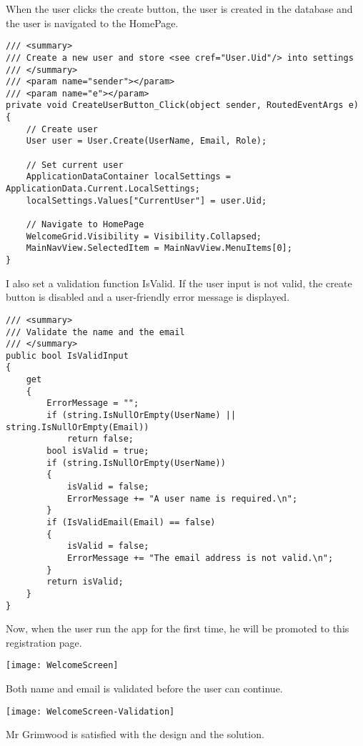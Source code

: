 \documentclass[report.tex]{subfiles}
\begin{document}
When the user clicks the create button, the user is created in the database and the user is navigated to the HomePage.

\begin{verbatim}
/// <summary>
/// Create a new user and store <see cref="User.Uid"/> into settings
/// </summary>
/// <param name="sender"></param>
/// <param name="e"></param>
private void CreateUserButton_Click(object sender, RoutedEventArgs e)
{
    // Create user
    User user = User.Create(UserName, Email, Role);

    // Set current user
    ApplicationDataContainer localSettings = ApplicationData.Current.LocalSettings;
    localSettings.Values["CurrentUser"] = user.Uid;

    // Navigate to HomePage
    WelcomeGrid.Visibility = Visibility.Collapsed;
    MainNavView.SelectedItem = MainNavView.MenuItems[0];
}
\end{verbatim}

I also set a validation function IsValid. If the user input is not valid, the create button is disabled and a user-friendly error message is displayed.

\begin{verbatim}
/// <summary>
/// Validate the name and the email
/// </summary>
public bool IsValidInput
{
    get
    {
        ErrorMessage = "";
        if (string.IsNullOrEmpty(UserName) || string.IsNullOrEmpty(Email)) 
            return false;
        bool isValid = true;
        if (string.IsNullOrEmpty(UserName))
        {
            isValid = false;
            ErrorMessage += "A user name is required.\n";
        }
        if (IsValidEmail(Email) == false)
        {
            isValid = false;
            ErrorMessage += "The email address is not valid.\n";
        }
        return isValid;
    }
}
\end{verbatim}

Now, when the user run the app for the first time, he will be promoted to this registration page.

\texttt{[image: WelcomeScreen]}

Both name and email is validated before the user can continue.

\texttt{[image: WelcomeScreen-Validation]}

Mr Grimwood is satisfied with the design and the solution.
\end{document}
